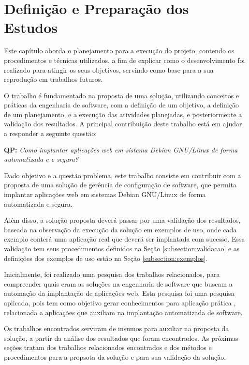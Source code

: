\chapter{Definição e Preparação dos Estudos}

\label{cap-metodologia}
Este capítulo aborda o planejamento para a execução do projeto,
contendo os procedimentos e técnicas utilizados, a fim de
explicar como o desenvolvimento foi realizado para atingir os seus objetivos,
servindo como base para a sua reprodução em trabalhos futuros.

O trabalho é fundamentado na proposta de uma solução, utilizando conceitos e práticas
da engenharia de software, com a definição de um objetivo, a definição de um planejamento,
e a execução das atividades planejadas, e posteriormente a validação dos resultados. 
A principal contribuição deste trabalho está em ajudar a responder a seguinte questão:

\begin{center}
 \textbf{QP:}
  \textit{
  Como implantar aplicações web em sistema Debian GNU/Linux de forma automatizada e
  e segura?
}
\end{center}

Dado objetivo e a questão problema, este trabalho consiste em contribuir
com a proposta de uma solução de gerência de configuração de software, que permita implantar
aplicações web em sistemas Debian GNU/Linux de forma automatizada e segura.

Além disso, a solução proposta deverá passar
por uma validação dos resultados, baseada na observação
da execução da solução em exemplos de uso, onde cada exemplo conterá uma aplicação
real que deverá ser implantada com sucesso. Essa validação tem seus procedimentos
definidos na Seção \ref{subsection:validacao} e as definições dos exemplos de uso
estão na Seção \ref{subsection:exemplos}.

Inicialmente, foi realizado uma pesquisa dos trabalhos relacionados, para compreender
quais eram as soluções na engenharia de software que buscam a automação da implantação
de aplicações web. Esta pesquisa foi uma pesquisa aplicada, pois tem como objetivo
gerar conhecimentos para aplicação prática \cite{gerhardt2009metodos},
relacionada a aplicações que auxiliam na implantação automatizada de software.

Os trabalhos encontrados serviram de insumos para auxiliar na proposta da
solução, a partir da análise dos resultados que foram encontrados. As próximas
seções tratam dos trabalhos relacionados encontrados e dos métodos e
procedimentos para a propsota da solução e para sua validação da solução.

